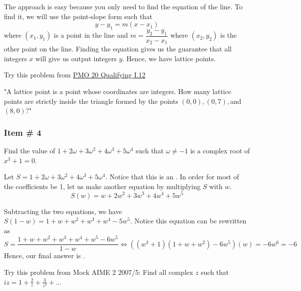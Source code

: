 \documentclass[11pt,paper=letter]{scrartcl}
\begin{document}

\sol

The approach is easy because you only need to find the equation of the line. To find it, we will use the point-slope form such that $$y-y_1 = m(x-x_1)$$ where $(x_1, y_1) $ is a point in the line and $m = \dfrac{y_2 - y_1}{x_2 - x_1}$ where $(x_2, y_2)$ is the other point on the line. Finding the equation gives us the guarantee that all integers $x$ will give us output integers $y$. Hence, we have  lattice points.

\begin{mdframed}
\begin{rem}
Try this problem from \href{http://pmo.ph/wp-content/uploads/2018/08/PMO-20-Qualifying-Round-with-answers-only.pdf}{PMO 20 Qualifying I.12}

"A lattice point is a point whose coordinates are integers. How many lattice points are strictly inside the triangle formed by the points $(0, 0), (0, 7),$and $(8, 0)$?"
\end{rem}
\end{mdframed}
\subsubsection{Item \# 4}

\begin{probboxed}
Find the value of $1 + 2\omega + 3\omega^2 + 4\omega^3 + 5\omega^4$ such that $\omega \neq -1$ is a complex root of $x^3 +1 = 0$.
    
\end{probboxed}



Let $S = 1 + 2\omega + 3\omega^2 + 4\omega^3 + 5\omega^4$. Notice that this is an . In order for most of the coefficients be 1, let us make another equation by multiplying $S$ with $w.$ $$S(w) = w + 2w^2 + 3w^3 + 4w^4 + 5w^5$$ 


Subtracting the two equations, we have $S(1-w) =   1+ w + w^2 + w^3 + w^4 - 5w^5 $. Notice this equation can be rewritten as $$S = \dfrac{1 + w + w^2 + w^3 + w^4 + w^5 - 6w^5}{1-w} \Leftrightarrow \left((w^3 + 1)(1 + w + w^2) - 6w^5\right)(w) = -6w^6 = -6$$ Hence, our final answer is .

\begin{mdframed}
\begin{rem}
Try this problem from Mock AIME 2 2007/5: Find all complex $z$ such that $iz = 1 + \frac{2}{z} + \frac{3}{z^2} + ...$
\end{rem}
\end{mdframed}
\end{document}
